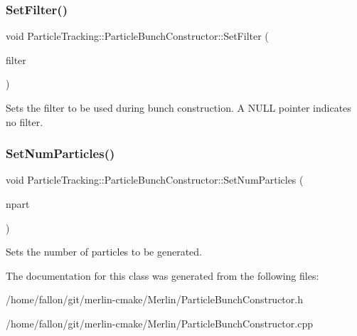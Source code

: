 \subsubsection{\texorpdfstring{Set\+Filter()}{SetFilter()}}
{\footnotesize\ttfamily void Particle\+Tracking\+::\+Particle\+Bunch\+Constructor\+::\+Set\+Filter (\begin{DoxyParamCaption}\item[{\hyperlink{classParticleTracking_1_1ParticleBunchFilter}{Particle\+Bunch\+Filter} $\ast$}]{filter }\end{DoxyParamCaption})\hspace{0.3cm}{\ttfamily [inline]}}

Sets the filter to be used during bunch construction. A N\+U\+LL pointer indicates no filter. \mbox{\label{classParticleTracking_1_1ParticleBunchConstructor_af9b173eff7bf38dd184d57b4cfc79eae}} 
\subsubsection{\texorpdfstring{Set\+Num\+Particles()}{SetNumParticles()}}
{\footnotesize\ttfamily void Particle\+Tracking\+::\+Particle\+Bunch\+Constructor\+::\+Set\+Num\+Particles (\begin{DoxyParamCaption}\item[{size\+\_\+t}]{npart }\end{DoxyParamCaption})}

Sets the number of particles to be generated. 

The documentation for this class was generated from the following files\+:\begin{DoxyCompactItemize}
\item 
/home/fallon/git/merlin-\/cmake/\+Merlin/Particle\+Bunch\+Constructor.\+h\item 
/home/fallon/git/merlin-\/cmake/\+Merlin/Particle\+Bunch\+Constructor.\+cpp\end{DoxyCompactItemize}
